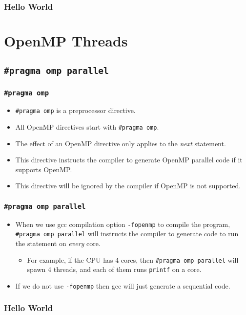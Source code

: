 \documentclass{beamer}
\begin{document}

\begin{frame}
\frametitle{Hello World} 
\end{frame}

\section{OpenMP Threads}

\subsection{\tt \#pragma omp parallel}

\begin{frame}
\frametitle{\tt \#pragma omp} 
\begin{itemize}
\item {\tt \#pragma omp} is a preprocessor directive.
\item All OpenMP directives start with {\tt \#pragma omp}.
\item The effect of an OpenMP directive only applies to the {\em next}
  statement.
\item This directive instructs the compiler to generate OpenMP
  parallel code if it supports OpenMP.
\item This directive will be ignored by the compiler if OpenMP is not
  supported.
\end{itemize}
\end{frame}

\begin{frame}
\frametitle{\tt \#pragma omp parallel} 
\begin{itemize}
\item When we use gcc compilation option {\tt -fopenmp} to compile the
  program, {\tt \#pragma omp parallel} will instructs the compiler to
  generate code to run the statement on {\em every} core.
\begin{itemize}
\item For example, if the CPU has 4 cores, then {\tt \#pragma omp
  parallel} will spawn 4 threads, and each of them runs {\tt printf}
  on a core.
\end{itemize}
\item If we do not use {\tt -fopenmp} then gcc will just generate a
  sequential code.
\end{itemize}
\end{frame}

\begin{frame}
\frametitle{Hello World} 
\end{frame}
\end{document}
